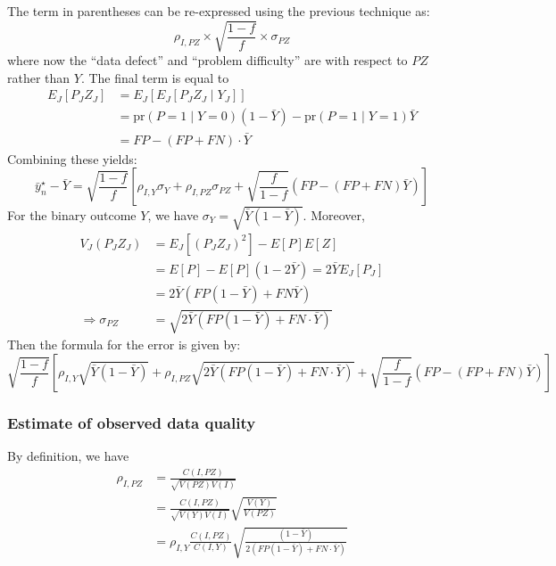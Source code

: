 \documentclass[12pt]{article}
\def\pr{\text{pr}}
\begin{document}
The term in parentheses can be re-expressed using the previous technique as:
$$
\rho_{I, PZ} \times \sqrt{\frac{1-f}{f}} \times \sigma_{PZ}
$$
where now the ``data defect'' and ``problem difficulty'' are with respect to $PZ$ rather than $Y$. The final term is equal to
$$
\begin{aligned}
E_J [P_J Z_J ] &= E_J [ E_J [ P_J Z_J \mid Y_J ] ] \\
&= \pr (P = 1 \mid Y = 0) (1-\bar Y) - \pr(P=1 \mid Y = 1) \bar Y \\
&= FP - (FP + FN) \cdot \bar Y
\end{aligned}
$$
Combining these yields:
$$
\bar y_n^\star - \bar Y = \sqrt{\frac{1-f}{f}} \left[\rho_{I,Y} \sigma_Y + \rho_{I, PZ} \sigma_{PZ} + \sqrt{\frac{f}{1-f}} \left( FP - (FP+FN) \bar Y \right) \right]
$$
For the binary outcome $Y$, we have $\sigma_Y = \sqrt{\bar Y (1-\bar Y)}$. Moreover,
$$
\begin{aligned}
V_J(P_J Z_J) &= E_J[(P_J Z_J)^2] - E[P] E[Z] \\
&= E[P] - E[P] (1 - 2 \bar Y) = 2 \bar Y E_J [ P_J ] \\
&= 2 \bar Y \left( FP (1-\bar Y) + FN \bar Y \right) \\
\Rightarrow \sigma_{PZ} &= \sqrt{ 2 \bar Y \left( FP (1-\bar Y) + FN \cdot  \bar Y \right) }
\end{aligned}
$$
Then the formula for the error is given by:
$$
\sqrt{\frac{1-f}{f}} \left[\rho_{I,Y} \sqrt{\bar Y (1-\bar Y)} + \rho_{I, PZ} \sqrt{ 2 \bar Y \left( FP (1-\bar Y) + FN \cdot \bar Y \right )} + \sqrt{\frac{f}{1-f}} \left( FP - (FP+FN) \bar Y \right) \right]
$$

\subsubsection*{Estimate of observed data quality}

By definition, we have
$$
\begin{aligned}
\rho_{I,PZ} &= \frac{C(I, PZ)}{\sqrt{V(PZ) V(I)}} \\
&= \frac{C(I, PZ)}{\sqrt{V(Y) V(I)}} \sqrt{\frac{V(Y)}{V(PZ)}} \\
&= \rho_{I,Y} \frac{C(I,PZ)}{C(I,Y)} \sqrt{ \frac{(1-\bar Y)}{2 ( FP (1-\bar Y) + FN \cdot \bar Y)} }
\end{aligned}
$$
\end{document}
